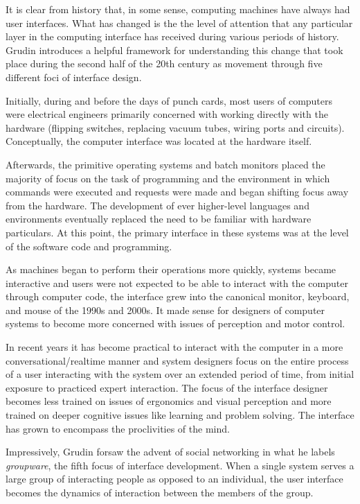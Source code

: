 It is clear from history that, in some sense, computing machines have always had user interfaces. What has changed is the the level of attention that any particular layer in the computing interface has received during various periods of history. Grudin \cite{continuity1990} introduces a helpful framework for understanding this change that took place during the second half of the 20th century as movement through five different foci of interface design. 

Initially, during and before the days of punch cards, most users of computers were electrical engineers primarily concerned with working directly with the hardware (flipping switches, replacing vacuum tubes, wiring ports and circuits). Conceptually, the computer interface was located at the hardware itself. 

Afterwards, the primitive operating systems and batch monitors placed the majority of focus on the task of programming and the environment in which commands were executed and requests were made and began shifting focus away from the hardware. The development of ever higher-level languages and environments eventually replaced the need to be familiar with hardware particulars. At this point, the primary interface in these systems was at the level of the software code and programming. 

As machines began to perform their operations more quickly, systems became interactive and users were not expected to be able to interact with the computer through computer code, the interface grew into the canonical monitor, keyboard, and mouse of the 1990s and 2000s. It made sense for designers of computer systems to become more concerned with issues of perception and motor control. 

In recent years it has become practical to interact with the computer in a more conversational/realtime manner and system designers focus on the entire process of a user interacting with the system over an extended period of time, from initial exposure to practiced expert interaction. The focus of the interface designer becomes less trained on issues of ergonomics and visual perception and more trained on deeper cognitive issues like learning and problem solving. The interface has grown to encompass the proclivities of the mind. 

Impressively, Grudin forsaw the advent of social networking in what he labels \emph{groupware}, the fifth focus of interface development. When a single system serves a large group of interacting people as opposed to an individual, the user interface becomes the dynamics of interaction between the members of the group.

